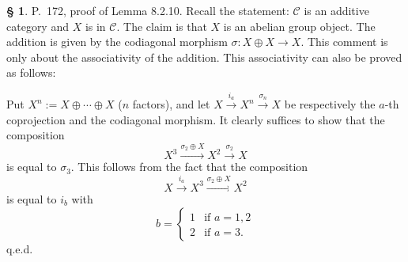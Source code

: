 \documentclass[12pt]{article}%
\theoremstyle{remark}
\theoremstyle{definition}
\newtheorem{s}[thm]{\S}%
\newcommand{\C}{\mathcal C}
\newcommand{\xr}{\xrightarrow}
\begin{document}
\begin{s} 
P.~172, proof of Lemma 8.2.10. Recall the statement: $\C$ is an additive category and $X$ is in $\C$. The claim is that $X$ is an abelian group object. The addition is given by the codiagonal morphism $\sigma:X\oplus X\to X$. This comment is only about the associativity of the addition. This associativity can also be proved as follows:

Put $X^n:=X\oplus\cdots\oplus X$ ($n$ factors), and let $X\xr{i_a}X^n\xr{\sigma_n}X$ be respectively the $a$-th coprojection and the codiagonal morphism. It clearly suffices to show that the composition 
$$
X^3\xr{\sigma_2\oplus X}X^2\xr{\sigma_2}X
$$ 
is equal to $\sigma_3$. This follows from the fact that the composition 
$$
X\xr{i_a}X^3\xr{\sigma_2\oplus X}X^2
$$ 
is equal to $i_b$ with 
$$
b=\begin{cases}1&\text{if }a=1,2\\2&\text{if }a=3.\end{cases}
$$ 
q.e.d.
\end{s}

%
\end{document}
